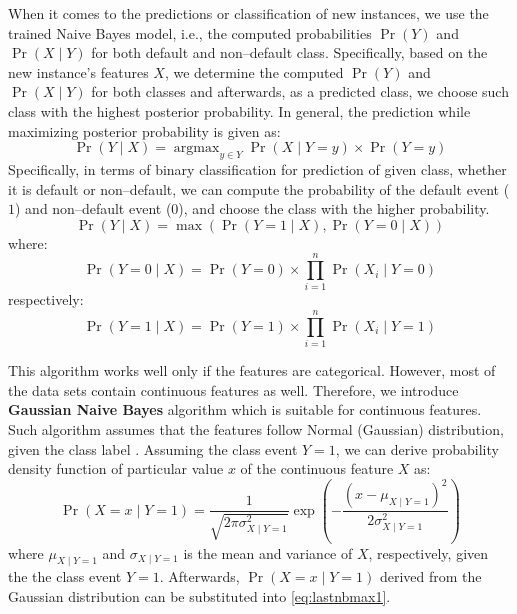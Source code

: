 When it comes to the predictions or classification of new instances, we use the trained Naive Bayes model, i.e., the computed probabilities $\operatorname{Pr}\left(Y\right)$ and $ \operatorname{Pr}\left(X \mid Y \right)$ for both default and non--default class.
Specifically, based on the new instance's features $X$, we determine the computed $\operatorname{Pr}\left(Y\right)$ and $ \operatorname{Pr}\left(X \mid Y \right)$ for both classes and afterwards, as a predicted class, we choose such class with the highest posterior probability. In general, the prediction while maximizing posterior probability is given as:
\begin{equation}\label{eq:nb-corrected}
    \operatorname{Pr}\left(Y \mid X \right) = \operatorname{argmax}_{y \in Y} \operatorname{Pr}\left(X \mid Y = y\right) \times \operatorname{Pr}(Y = y)
\end{equation}
Specifically, in terms of binary classification for prediction of given class, whether it is default or non--default, we can compute the probability of the default event ($1$) and non--default event ($0$), and choose the class with the higher probability.
\begin{equation}\label{eq}
    \operatorname{Pr}\left(Y \mid X \right)  = \max \left(\operatorname{Pr}\left(Y=1 \mid X\right), \operatorname{Pr}\left(Y=0 \mid X\right)\right)
\end{equation}
where:
\begin{equation}
    \operatorname{Pr}\left(Y=0 \mid X \right) = \operatorname{Pr}\left(Y=0\right) \times \prod_{i=1}^{n} \operatorname{Pr}\left(X_i \mid Y=0\right)
\end{equation}
respectively:
\begin{equation}\label{eq:lastnbmax1}
    \operatorname{Pr}\left(Y=1 \mid X \right) = \operatorname{Pr}\left(Y=1\right) \times \prod_{i=1}^{n} \operatorname{Pr}\left(X_i \mid Y=1\right)
\end{equation}

This algorithm works well only if the features are categorical.
However, most of the data sets contain continuous features as well.
Therefore, we introduce \textbf{Gaussian Naive Bayes} algorithm which is suitable for continuous features. Such algorithm assumes that the features follow Normal (Gaussian) distribution, given the class label \citep{jahromi2017non}.
Assuming the class event $Y=1$, we can derive probability density function of particular value $x$ of the continuous feature $X$ as:
\begin{equation}\label{eq:lastgnb}
    \operatorname{Pr}\left(X = x \mid Y = 1\right) = \frac{1}{\sqrt{2 \pi \sigma_{X \mid Y=1}^{2}}} \exp \left(-\frac{\left(x - \mu_{X \mid Y=1}\right)^{2}}{2 \sigma_{X \mid Y=1}^{2}}\right)
\end{equation}
where $\mu_{X \mid Y=1}$ and $\sigma_{X \mid Y=1}$ is the mean and variance of $X$, respectively, given the the class event $Y=1$.
Afterwards, $\operatorname{Pr}\left(X = x \mid Y = 1\right)$ derived from the Gaussian distribution can be substituted into \autoref{eq:lastnbmax1}.
